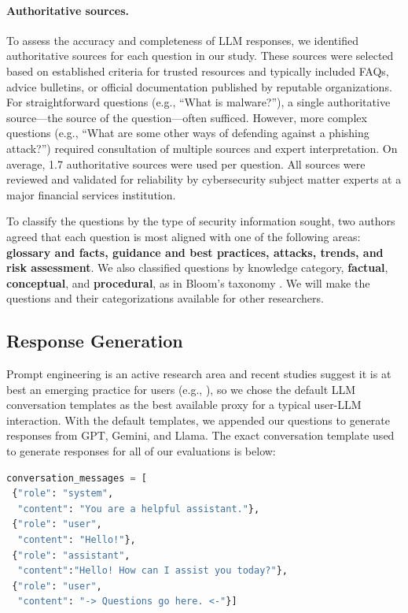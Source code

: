 {\paragraph{Authoritative sources.}
To assess the accuracy and completeness of LLM responses, we identified authoritative sources for each question in our study. These sources were selected based on established criteria for trusted resources and typically included FAQs, advice bulletins, or official documentation published by reputable organizations. For straightforward questions (e.g., “What is malware?”), a single authoritative source---the source of the question---often sufficed. However, more complex questions (e.g., “What are some other ways of defending against a phishing attack?”) required consultation of multiple sources and expert interpretation. On average, 1.7 authoritative sources were used per question. All sources were reviewed and validated for reliability by cybersecurity subject matter experts at a major financial services institution.
}

To classify the questions by the type of security information sought, two authors agreed that each question is most aligned with one of the following areas: \textbf{glossary and facts, guidance and best practices, attacks, trends, and risk assessment}. We also classified questions by knowledge category, \textbf{factual}, \textbf{conceptual}, and \textbf{procedural}, as in Bloom's taxonomy \cite{blooms-taxonomy-2001}.  We will make the questions and their categorizations available for other researchers.



\subsection{Response Generation} \label{response-generation}
Prompt engineering is an active research area and recent studies suggest it is at best an emerging practice for users (e.g., \cite{zamfirescu2023johnny}), so we chose the default LLM conversation templates as the best available proxy for a typical user-LLM interaction. With the default templates, we
appended our questions to generate responses from GPT, Gemini, and Llama. 
The exact conversation template used to generate responses for all of our evaluations is below:
\begin{lstlisting}[language=Python]
conversation_messages = [
 {"role": "system",
  "content": "You are a helpful assistant."},
 {"role": "user",
  "content": "Hello!"},
 {"role": "assistant",
  "content":"Hello! How can I assist you today?"},
 {"role": "user", 
  "content": "-> Questions go here. <-"}]
\end{lstlisting}

